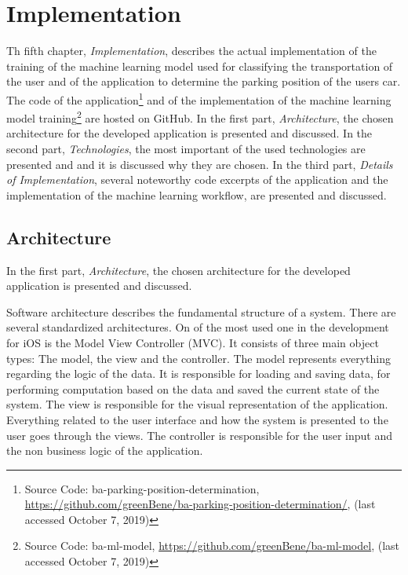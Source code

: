 \chapter{Implementation}
Th fifth chapter, \textit{Implementation}, describes the actual implementation of the training of the machine learning model used for classifying the transportation of the user and of the application to determine the parking position of the users car. The code of the application\footnote{Source Code: ba-parking-position-determination, \url{https://github.com/greenBene/ba-parking-position-determination/}, (last accessed  October 7, 2019)} and of the implementation of the machine learning model training\footnote{Source Code: ba-ml-model, \url{https://github.com/greenBene/ba-ml-model}, (last accessed  October 7, 2019)} are hosted on GitHub.
In the first part, \textit{Architecture}, the chosen architecture for the developed application is presented and discussed.
In the second part, \textit{Technologies}, the most important of the used technologies are presented and and it is discussed why they are chosen.
In the third part, \textit{Details of Implementation}, several noteworthy code excerpts of the application and the implementation of the machine learning workflow, are presented and discussed.

\section{Architecture}
In the first part, \textit{Architecture}, the chosen architecture for the developed application is presented and discussed.

Software architecture describes the fundamental structure of a system. There are several standardized architectures. On of the most used one in the development for iOS is the Model View Controller (MVC). It consists of three main object types: The model, the view and the controller. The model represents everything regarding the logic of the data. It is responsible for loading and saving data, for performing computation based on the data and saved the current state of the system. The view is responsible for the visual representation of the application. Everything related to the user interface and how the system is presented to the user goes through the views. The controller is responsible for the user input and the non business logic of the application. 

